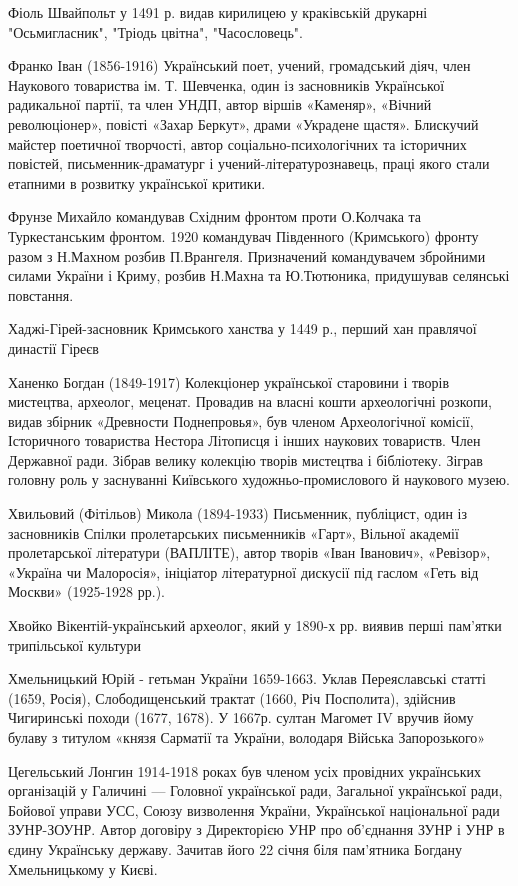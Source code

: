 Фіоль Швайпольт у 1491 р. видав кирилицею у краківській друкарні "Осьмигласник", "Тріодь цвітна", "Часословець".

Франко Іван (1856-1916) Український поет, учений, громадський діяч, член Наукового товариства ім. Т. Шевченка, один із засновників Української радикальної партії, та член УНДП, автор віршів «Каменяр», «Вічний революціонер», повісті «Захар Беркут», драми «Украдене щастя». Блискучий майстер поетичної творчості, автор соціально-психологічних та історичних повістей, письменник-драматург і учений-літературознавець, праці якого стали етапними в розвитку української критики.

Фрунзе Михайло командував Східним фронтом проти О.Колчака та Туркестанським фронтом. 1920 командувач Південного (Кримського) фронту разом з Н.Махном розбив П.Врангеля.    Призначений командувачем збройними силами України і Криму, розбив Н.Махна та Ю.Тютюника, придушував селянські повстання. 

Хаджі-Гірей-засновник Кримського ханства у 1449 р., перший хан правлячої династії Гіреєв

Ханенко Богдан (1849-1917) Колекціонер української старовини і творів мистецтва, археолог, меценат. Провадив на власні кошти археологічні розкопи, видав збірник «Древности Поднепровья», був членом Археологічної комісії, Історичного товариства Нестора Літописця і інших наукових товариств. Член Державної ради. Зібрав велику колекцію творів мистецтва і бібліотеку. Зіграв головну роль у заснуванні Київського художньо-промислового й наукового музею.

Хвильовий (Фітільов) Микола (1894-1933) Письменник, публіцист, один із засновників Спілки пролетарських письменників «Гарт», Вільної академії пролетарської літератури (ВАПЛІТЕ), автор творів «Іван Іванович», «Ревізор», «Україна чи Малоросія», ініціатор літературної дискусії під гаслом «Геть від Москви» (1925-1928 рр.).

Хвойко Вікентій-український археолог, який у 1890-х рр. виявив перші пам’ятки трипільської культури

Хмельницький Юрій  - гетьман України 1659-1663. Уклав Переяславські статті (1659, Росія), Слободищенський трактат (1660, Річ Посполита), здійснив Чигиринські походи (1677, 1678). У 1667р. султан Магомет IV вручив йому булаву з титулом «князя Сарматії та України, володаря Війська Запорозького»

Цегельський Лонгин  1914-1918 роках був членом усіх провідних українських організацій у Галичині --- Головної української ради, Загальної української ради, Бойової управи УСС, Союзу визволення України,  Української національної ради ЗУНР-ЗОУНР. Автор договіру з Директорією УНР про об'єднання ЗУНР і УНР в єдину Українську державу. Зачитав його 22 січня біля пам'ятника Богдану Хмельницькому у Києві.

